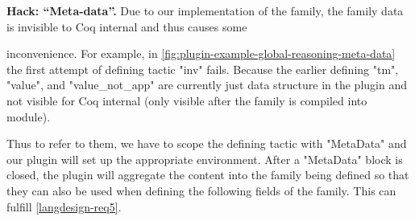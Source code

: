 \textbf{Hack: ``Meta-data''.} Due to our implementation of the family,
the family data is invisible to Coq internal and thus causes some

inconvenience. For example, in
\cref{fig:plugin-example-global-reasoning-meta-data} the first attempt
of defining tactic "inv" fails. Because the earlier defining "tm",
"value", and "value_not_app" are currently just data structure in the
plugin and not visible for Coq internal (only visible after the family
is compiled into module). 

Thus to refer to them, we have to scope the defining tactic with
"MetaData" and our plugin will set up the appropriate environment. After
a "MetaData" block is closed, the plugin will aggregate the content into
the family being defined so that they can also be used when defining
the following fields of the family.
This can fulfill \ref{langdesign-req5}.





